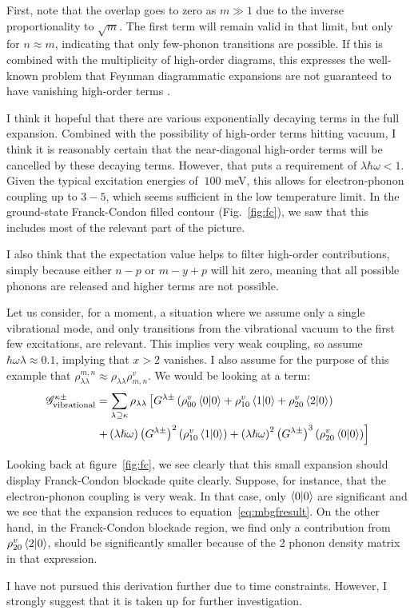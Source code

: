 First, note that the overlap goes to zero as $m\gg 1$ due to the inverse proportionality to $\sqrt{m}$. The first term will remain valid in that limit, but only for $n\approx m$, indicating that only few-phonon transitions are possible. If this is combined with the multiplicity of high-order diagrams, this expresses the well-known problem that Feynman diagrammatic expansions are not guaranteed to have vanishing high-order terms \cite{mattuck}.

I think it hopeful that there are various exponentially decaying terms in the full expansion. Combined with the possibility of high-order terms hitting vacuum, I think it is reasonably certain that the near-diagonal high-order terms will be cancelled by these decaying terms. However, that puts a requirement of $ \lambda \hbar \omega < 1$. Given the typical excitation energies of $~100$ meV, this allows for electron-phonon coupling up to $3-5$, which seems sufficient in the low temperature limit. In the ground-state Franck-Condon filled contour (Fig.~\ref{fig:fc}), we saw that this includes most of the relevant part of the picture.

I also think that the expectation value helps to filter high-order contributions, simply because either $n-p$ or $m-y+p$ will hit zero, meaning that all possible phonons are released and higher terms are not possible. 

Let us consider, for a moment, a situation where we assume only a single vibrational mode, and only transitions from the vibrational vacuum to the first few excitations, are relevant. This implies very weak coupling, so assume $\hbar \omega \lambda \approx 0.1$, implying that $x>2$ vanishes. I also assume for the purpose of this example that $\rho^{m,n}_{\lambda\lambda} \approx \rho_{\lambda\lambda} \rho^v_{m,n}$. We would be looking at a term:
\begin{align*}
\mathscr{G}^{\kappa\pm}_\text{vibrational} &= \sum_{\lambda\supseteq \kappa} \rho_{\lambda \lambda} \left[ G^{\lambda\pm} \left( \rho_{00}^v \braket{0|0} + \rho_{10}^v \braket{1|0} + \rho_{20}^v\braket{2|0}\right) \right. \\ &\left.+ \left(\lambda\hslash\omega\right)\left(G^{\lambda\pm}\right)^2 \left(\rho_{10}^v \braket{1|0}\right) + \left(\lambda\hslash\omega\right)^2 \left(G^{\lambda\pm}\right)^3 \left( \rho_{20}^v \braket{0|0}\right) \right]
\end{align*}

Looking back at figure~\ref{fig:fc}, we see clearly that this small expansion should display Franck-Condon blockade quite clearly. Suppose, for instance, that the electron-phonon coupling is very weak. In that case, only $\braket{0|0}$ are significant and we see that the expansion reduces to equation~\ref{eq:mbgfresult}. On the other hand, in the Franck-Condon blockade region, we find only a contribution from $\rho^v_{20} \braket{2|0}$, should be significantly smaller because of the 2 phonon density matrix in that expression.

I have not pursued this derivation further due to time constraints. However, I strongly suggest that it is taken up for further investigation.



\clearpage
{}